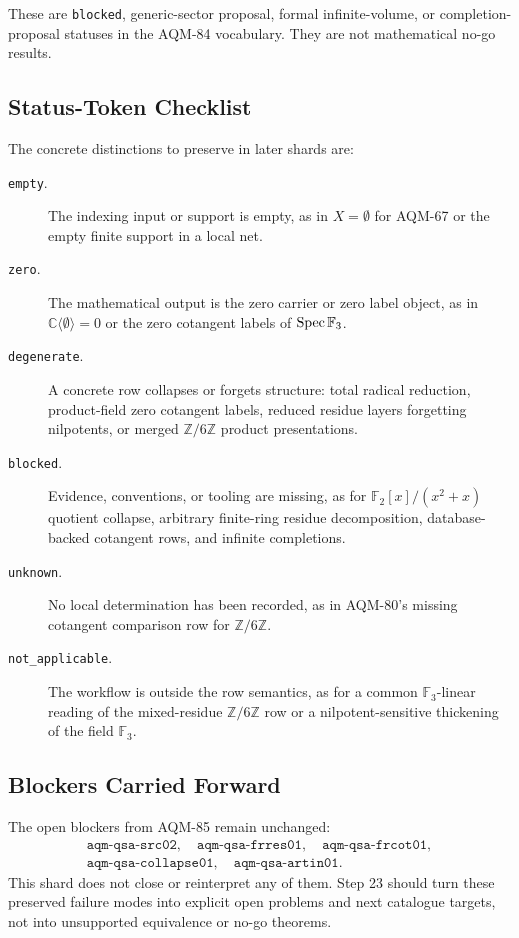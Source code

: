 These are \texttt{blocked}, generic-sector proposal, formal infinite-volume,
or completion-proposal statuses in the AQM-84 vocabulary.  They are not
mathematical no-go results.

\subsection{Status-Token Checklist}

The concrete distinctions to preserve in later shards are:

\begin{description}
\item[\texttt{empty}.] The indexing input or support is empty, as in
  \(X=\emptyset\) for AQM-67 or the empty finite support in a local net.
\item[\texttt{zero}.] The mathematical output is the zero carrier or zero
  label object, as in \(\mathbb C\langle\emptyset\rangle=0\) or the zero
  cotangent labels of \(\operatorname{Spec}\mathbb F_3\).
\item[\texttt{degenerate}.] A concrete row collapses or forgets structure:
  total radical reduction, product-field zero cotangent labels, reduced
  residue layers forgetting nilpotents, or merged \(\mathbb Z/6\mathbb Z\)
  product presentations.
\item[\texttt{blocked}.] Evidence, conventions, or tooling are missing, as
  for \(\mathbb F_2[x]/(x^2+x)\) quotient collapse, arbitrary finite-ring
  residue decomposition, database-backed cotangent rows, and infinite
  completions.
\item[\texttt{unknown}.] No local determination has been recorded, as in
  AQM-80's missing cotangent comparison row for \(\mathbb Z/6\mathbb Z\).
\item[\texttt{not\_applicable}.] The workflow is outside the row semantics,
  as for a common \(\mathbb F_3\)-linear reading of the mixed-residue
  \(\mathbb Z/6\mathbb Z\) row or a nilpotent-sensitive thickening of the
  field \(\mathbb F_3\).
\end{description}

\subsection{Blockers Carried Forward}

The open blockers from AQM-85 remain unchanged:
\[
  \begin{gathered}
  \texttt{aqm-qsa-src02},\quad
  \texttt{aqm-qsa-frres01},\quad
  \texttt{aqm-qsa-frcot01},\\
  \texttt{aqm-qsa-collapse01},\quad
  \texttt{aqm-qsa-artin01}.
  \end{gathered}
\]
This shard does not close or reinterpret any of them.  Step 23 should turn
these preserved failure modes into explicit open problems and next catalogue
targets, not into unsupported equivalence or no-go theorems.

